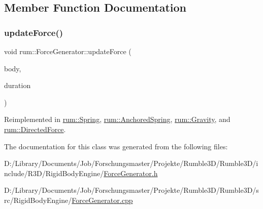 \subsection{Member Function Documentation}
\mbox{\label{classrum_1_1_force_generator_aee5f1dc03ba285b5122fa2a8ba790230}} 
\subsubsection{\texorpdfstring{update\+Force()}{updateForce()}}
{\footnotesize\ttfamily void rum\+::\+Force\+Generator\+::update\+Force (\begin{DoxyParamCaption}\item[{\mbox{\hyperlink{classrum_1_1_rigid_body}{Rigid\+Body}} $\ast$}]{body,  }\item[{\mbox{\hyperlink{namespacerum_a7e8cca23573d5eaead0f138cbaa4862c}{real}}}]{duration }\end{DoxyParamCaption})\hspace{0.3cm}{\ttfamily [virtual]}}



Reimplemented in \mbox{\hyperlink{classrum_1_1_spring_a31f5e48beb95ebc394ff2cb1dd813708}{rum\+::\+Spring}}, \mbox{\hyperlink{classrum_1_1_anchored_spring_aeb146ac725ea6f9ee9c52b322ba70452}{rum\+::\+Anchored\+Spring}}, \mbox{\hyperlink{classrum_1_1_gravity_abf5ce00e3e2e924a086ada82fc9d1404}{rum\+::\+Gravity}}, and \mbox{\hyperlink{classrum_1_1_directed_force_af775ae939b728dadcfcfa6d6719c6015}{rum\+::\+Directed\+Force}}.



The documentation for this class was generated from the following files\+:\begin{DoxyCompactItemize}
\item 
D\+:/\+Library/\+Documents/\+Job/\+Forschungsmaster/\+Projekte/\+Rumble3\+D/\+Rumble3\+D/include/\+R3\+D/\+Rigid\+Body\+Engine/\mbox{\hyperlink{_force_generator_8h}{Force\+Generator.\+h}}\item 
D\+:/\+Library/\+Documents/\+Job/\+Forschungsmaster/\+Projekte/\+Rumble3\+D/\+Rumble3\+D/src/\+Rigid\+Body\+Engine/\mbox{\hyperlink{_force_generator_8cpp}{Force\+Generator.\+cpp}}\end{DoxyCompactItemize}

